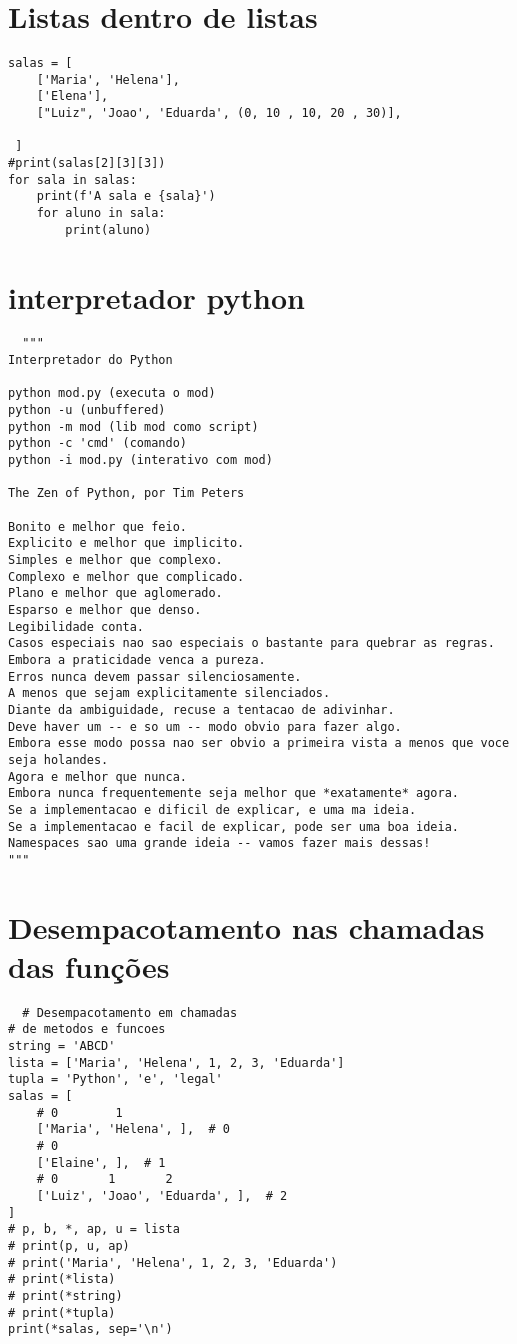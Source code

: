 \documentclass{article}
\begin{document}
\section{Listas dentro de listas}
\begin {lstlisting}
salas = [
    ['Maria', 'Helena'],
    ['Elena'],
    ["Luiz", 'Joao', 'Eduarda', (0, 10 , 10, 20 , 30)],
  
 ]
#print(salas[2][3][3])
for sala in salas:
    print(f'A sala e {sala}')
    for aluno in sala:
        print(aluno)
\end{lstlisting}
\section{interpretador python}
\begin{lstlisting}
  """
Interpretador do Python

python mod.py (executa o mod)
python -u (unbuffered)
python -m mod (lib mod como script)
python -c 'cmd' (comando)
python -i mod.py (interativo com mod)

The Zen of Python, por Tim Peters

Bonito e melhor que feio.
Explicito e melhor que implicito.
Simples e melhor que complexo.
Complexo e melhor que complicado.
Plano e melhor que aglomerado.
Esparso e melhor que denso.
Legibilidade conta.
Casos especiais nao sao especiais o bastante para quebrar as regras.
Embora a praticidade venca a pureza.
Erros nunca devem passar silenciosamente.
A menos que sejam explicitamente silenciados.
Diante da ambiguidade, recuse a tentacao de adivinhar.
Deve haver um -- e so um -- modo obvio para fazer algo.
Embora esse modo possa nao ser obvio a primeira vista a menos que voce seja holandes.
Agora e melhor que nunca.
Embora nunca frequentemente seja melhor que *exatamente* agora.
Se a implementacao e dificil de explicar, e uma ma ideia.
Se a implementacao e facil de explicar, pode ser uma boa ideia.
Namespaces sao uma grande ideia -- vamos fazer mais dessas!
""" 
\end{lstlisting}
\section{Desempacotamento nas chamadas das funções}
\begin{lstlisting}
  # Desempacotamento em chamadas
# de metodos e funcoes
string = 'ABCD'
lista = ['Maria', 'Helena', 1, 2, 3, 'Eduarda']
tupla = 'Python', 'e', 'legal'
salas = [
    # 0        1
    ['Maria', 'Helena', ],  # 0
    # 0
    ['Elaine', ],  # 1
    # 0       1       2
    ['Luiz', 'Joao', 'Eduarda', ],  # 2
]
# p, b, *, ap, u = lista
# print(p, u, ap)
# print('Maria', 'Helena', 1, 2, 3, 'Eduarda')
# print(*lista)
# print(*string)
# print(*tupla)
print(*salas, sep='\n')
\end{lstlisting}
\end{document}
